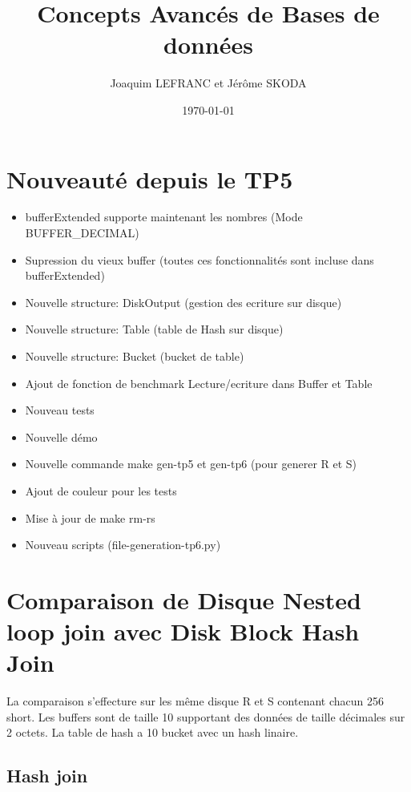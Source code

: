 \documentclass[a4paper]{article}
\title{Concepts Avancés de Bases de données}
\author{Joaquim LEFRANC et Jérôme SKODA}
\date{\today}
\begin{document}
\maketitle


\section{Nouveauté depuis le TP5}

\begin{itemize}
  \item bufferExtended supporte maintenant les nombres (Mode BUFFER\_DECIMAL)
  \item Supression du vieux buffer (toutes ces fonctionnalités sont incluse dans bufferExtended)
  \item Nouvelle structure: DiskOutput (gestion des ecriture sur disque)
  \item Nouvelle structure: Table  (table de Hash sur disque)
  \item Nouvelle structure: Bucket (bucket de table)
  \item Ajout de fonction de benchmark Lecture/ecriture dans Buffer et Table
  \item Nouveau tests
  \item Nouvelle démo
  \item Nouvelle commande make gen-tp5 et gen-tp6 (pour generer R et S)
  \item Ajout de couleur pour les tests
  \item Mise à jour de make rm-rs
  \item Nouveau scripts (file-generation-tp6.py)
\end{itemize}

\section{Comparaison de Disque Nested loop join avec Disk Block Hash Join}

La comparaison s'effecture sur les même disque R et S contenant chacun 256
short. Les buffers sont de taille 10 supportant des données de taille
décimales sur 2 octets. La table de hash a 10 bucket avec un hash linaire.

\subsection{Hash join}
\end{document}
